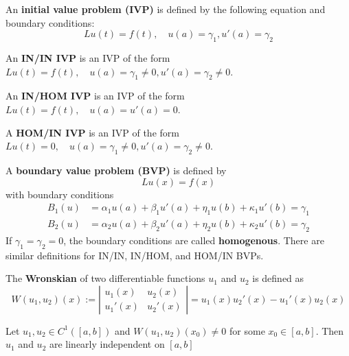 \begin{definition}
	An \textbf{initial value problem (IVP)} is defined by the following equation and boundary conditions:
	\[
		L u(t) = f(t), \quad u(a) = \gamma_1, u'(a) = \gamma_2
	\]
\end{definition}

\begin{definition}
	An \textbf{IN/IN IVP} is an IVP of the form $Lu(t) = f(t), \quad u(a) = \gamma_1 \ne 0, u'(a) = \gamma_2 \ne 0$.
\end{definition}

\begin{definition}
	An \textbf{IN/HOM IVP} is an IVP of the form $Lu(t) = f(t), \quad u(a) = u'(a) = 0$.
\end{definition}

\begin{definition}
	A \textbf{HOM/IN IVP} is an IVP of the form $Lu(t) = 0, \quad u(a) = \gamma_1 \ne 0, u'(a) = \gamma_2 \ne 0$.
\end{definition}

\begin{definition}
	A \textbf{boundary value problem (BVP)} is defined by
	\[
		Lu(x) = f(x)
	\]
	with boundary conditions
	\[
		\begin{aligned}
			B_1(u) & = \alpha_1 u(a) + \beta_1 u'(a) + \eta_1 u(b) + \kappa_1 u'(b) = \gamma_1 \\
			B_2(u) & = \alpha_2 u(a) + \beta_2 u'(a) + \eta_2 u(b) + \kappa_2 u'(b) = \gamma_2
		\end{aligned}
	\]
	If $\gamma_1 = \gamma_2 = 0$, the boundary conditions are called \textbf{homogenous}.
	There are similar definitions for IN/IN, IN/HOM, and HOM/IN BVPs.
\end{definition}

\begin{definition}
	The \textbf{Wronskian} of two differentiable functions $u_1$ and $u_2$ is defined as
	\[
		W(u_1, u_2)(x) := \left|
		\begin{matrix}
			u_1(x) & u_2(x) \\
			u_1'(x) & u_2'(x)
		\end{matrix}
		\right| = u_1(x) u_2'(x) - u_1'(x) u_2(x)
	\]
\end{definition}

\begin{theorem}
	Let $u_1, u_2 \in C^1 ([a, b])$ and $W(u_1, u_2)(x_0) \ne 0$ for some $x_0 \in [a, b]$. Then $u_1$ and $u_2$ are linearly independent on $[a, b]$
\end{theorem}

